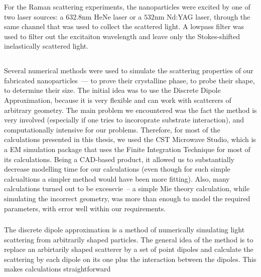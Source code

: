         \subsubsection{}
        \label{sec:Raman}
                For the Raman scattering experiments, the nanoparticles were excited by one of two laser sources: a $632.8$nm HeNe laser
            or a $532$nm Nd:YAG laser, through the same channel that was used to collect the scattered light. A lowpass filter was used
            to filter out the excitaiton wavelength and leave only the Stokes-shifted inelastically scattered light.

    \subsection{}
    \label{sec:Numeric}
        Several numerical methods were used to simulate the scattering properties of our fabricated nanoparticles~--- to prove their
        crystalline phase, to probe their shape, to determine their size. The initial idea was to use the Discrete Dipole Approximation,
        because it is very flexible and can work with scatterers of arbitrary geometry. The main problem we encountered was the fact
        the method is very involved (especially if one tries to incoroprate substrate interaction), and computationally intensive for
        our problems. Therefore, for most of the calculations presented in this thesis, we used the CST Microwave Studio, which is a
        EM simulation package that uses the Finite Integration Technique for most of its calculations. Being a CAD-based product, it
        allowed us to substantially decrease modelling time for our calculations (even though for such simple calcualtions a simpler
        method would have been more fitting). Also, many calculations turned out to be excessvie~-- a simple Mie theory calculation,
        while simulating the incorrect geometry, was more than enough to model the required parameters, with error well within our
        requirements.

        \subsubsection{}
        \label{subsec:DDA}

            The discrete dipole approximation is a method of numerically simulating light scattering from arbitrarily shaped particles.
            The general idea of the method is to replace an arbirtarily shaped scatterer by a set of point dipoles and calculate the
            scattering by each dipole on its one plus the interaction between the dipoles. This makes calculations straightforward

